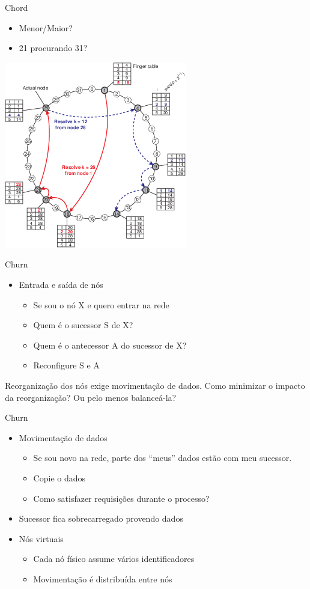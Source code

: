 \begin{frame}{Chord}
\begin{itemize}
	\item Menor/Maior?
	\item 21 procurando 31?
\end{itemize}

\includegraphics[width=.45\textwidth]{images/05-04}	
\end{frame}

\begin{frame}{Churn}
\begin{itemize}
	\item Entrada e saída de nós
	\begin{itemize}
		\item Se sou o nó X e quero entrar na rede
		\item Quem é o sucessor S de X?
		\item Quem é o antecessor A do sucessor de X?
		\item Reconfigure S e A
	\end{itemize}
\end{itemize}
\end{frame}

Reorganização dos nós exige movimentação de dados. Como minimizar o impacto da reorganização? Ou pelo menos balanceá-la?

\begin{frame}{Churn}
\begin{itemize}
	\item Movimentação de dados
	\begin{itemize}
		\item Se sou novo na rede, parte dos ``meus'' dados estão com meu sucessor.
		\item Copie o dados
		\item Como satisfazer requisições durante o processo?
	\end{itemize}
	\pause
	\item Sucessor fica sobrecarregado provendo dados
	\item Nós virtuais
	\begin{itemize}
		\item Cada nó físico assume vários identificadores
		\item Movimentação é distribuída entre nós
	\end{itemize}
\end{itemize}
\end{frame}

